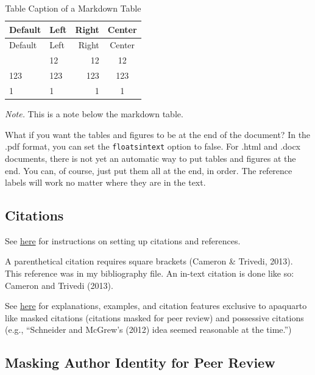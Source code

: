 \documentclass[
  jou,
  longtable,
  colorlinks=true,linkcolor=blue,citecolor=blue,urlcolor=blue]{apa7}
\begin{document}
\begin{ThreePartTable}

\begin{longtable}[]{@{}llrc@{}}
\caption{Table Caption of a Markdown
Table}\label{tbl-mymarkdowntable}\tabularnewline
\toprule\noalign{}
Default & Left & Right & Center \\
\midrule\noalign{}
\endfirsthead
\toprule\noalign{}
Default & Left & Right & Center \\
\midrule\noalign{}
\endhead
\bottomrule\noalign{}
\endlastfoot
12 & 12 & 12 & 12 \\
123 & 123 & 123 & 123 \\
1 & 1 & 1 & 1 \\
\end{longtable}

{\noindent \emph{Note.} This is a note below the markdown table.}

\end{ThreePartTable}

What if you want the tables and figures to be at the end of the
document? In the .pdf format, you can set the \texttt{floatsintext}
option to false. For .html and .docx documents, there is not yet an
automatic way to put tables and figures at the end. You can, of course,
just put them all at the end, in order. The reference labels will work
no matter where they are in the text.

\subsection{Citations}\label{citations}

See
\href{https://quarto.org/docs/authoring/footnotes-and-citations.html}{here}
for instructions on setting up citations and references.

A parenthetical citation requires square brackets (Cameron \& Trivedi,
2013). This reference was in my bibliography file. An in-text citation
is done like so: Cameron and Trivedi (2013).

See
\href{https://wjschne.github.io/apaquarto/writing.html\#references}{here}
for explanations, examples, and citation features exclusive to apaquarto
like masked citations (citations masked for peer review) and possessive
citations (e.g., ``Schneider and McGrew's (2012) idea seemed reasonable
at the time.'')

\subsection{Masking Author Identity for Peer
Review}\label{masking-author-identity-for-peer-review}
\end{document}
